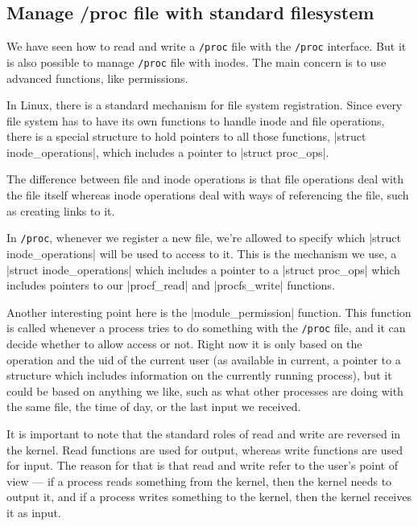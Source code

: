 \documentclass[10pt, oneside]{book}
\begin{document}

\subsection{Manage /proc file with standard filesystem}
\label{sec:manage_procfs}
We have seen how to read and write a \verb|/proc| file with the \verb|/proc| interface.
But it is also possible to manage \verb|/proc| file with inodes.
The main concern is to use advanced functions, like permissions.

In Linux, there is a standard mechanism for file system registration.
Since every file system has to have its own functions to handle inode and file operations, there is a special structure to hold pointers to all those functions, \cpp|struct inode_operations|, which includes a pointer to \cpp|struct proc_ops|.

The difference between file and inode operations is that file operations deal with the file itself whereas inode operations deal with ways of referencing the file, such as creating links to it.

In \verb|/proc|, whenever we register a new file, we're allowed to specify which \cpp|struct inode_operations| will be used to access to it.
This is the mechanism we use, a \cpp|struct inode_operations| which includes a pointer to a \cpp|struct proc_ops| which includes pointers to our \cpp|procf_read| and \cpp|procfs_write| functions.

Another interesting point here is the \cpp|module_permission| function.
This function is called whenever a process tries to do something with the \verb|/proc| file, and it can decide whether to allow access or not.
Right now it is only based on the operation and the uid of the current user (as available in current, a pointer to a structure which includes information on the currently running process), but it could be based on anything we like, such as what other processes are doing with the same file, the time of day, or the last input we received.

It is important to note that the standard roles of read and write are reversed in the kernel.
Read functions are used for output, whereas write functions are used for input.
The reason for that is that read and write refer to the user's point of view --- if a process reads something from the kernel, then the kernel needs to output it, and if a process writes something to the kernel, then the kernel receives it as input.

\end{document}

